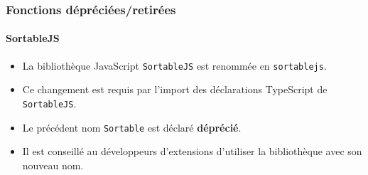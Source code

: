 %

\begin{frame}[fragile]
	\frametitle{Fonctions dépréciées/retirées}
	\framesubtitle{SortableJS}

	\begin{itemize}
		\item La bibliothèque JavaScript \texttt{SortableJS} est renommée en \texttt{sortablejs}.

		\item Ce changement est requis par l'import des déclarations TypeScript
			de \texttt{SortableJS}.

		\item Le précédent nom \texttt{Sortable} est déclaré \textbf{déprécié}.

		\item Il est conseillé au développeurs d'extensions d'utiliser la bibliothèque avec son nouveau nom.
	\end{itemize}

\end{frame}

